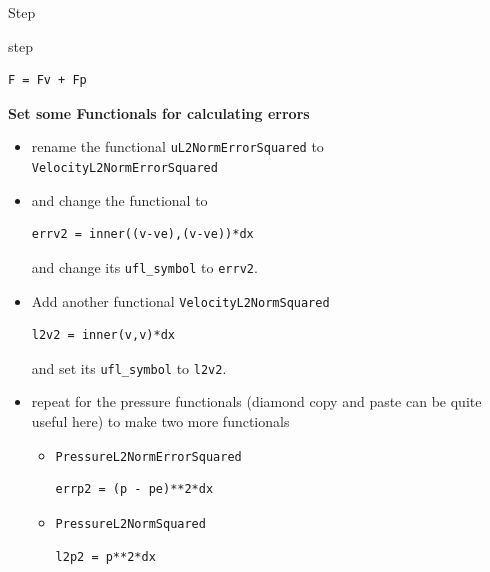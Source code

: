 \begin{steps}{Step}
\begin{steps}{step}
\begin{lstlisting}[style=UFL]
F = Fv + Fp
    \end{lstlisting}
  \item\textbf{ Set some Functionals for calculating errors}
 \begin{itemize}
 \item rename the functional \texttt{uL2NormErrorSquared} to \texttt{VelocityL2NormErrorSquared} 
    \item and change  the functional to
      \begin{lstlisting}[style=Ufl]
        errv2 = inner((v-ve),(v-ve))*dx
      \end{lstlisting}
      and change its \texttt{ufl\_symbol} to \texttt{errv2}.
    \item Add another functional \texttt{VelocityL2NormSquared}
      \begin{lstlisting}[style=Ufl]
        l2v2 = inner(v,v)*dx
      \end{lstlisting}
      and set its \texttt{ufl\_symbol} to \texttt{l2v2}.
    \item repeat for the pressure functionals (diamond copy and paste can be
      quite useful here) to make two more functionals
      \begin{itemize}
      \item \texttt{PressureL2NormErrorSquared}
        \begin{lstlisting}[style=Ufl]
        errp2 = (p - pe)**2*dx
      \end{lstlisting}
    \item \texttt{PressureL2NormSquared}
        \begin{lstlisting}[style=Ufl]
        l2p2 = p**2*dx
      \end{lstlisting}
      \end{itemize}

    \end{itemize}



\end{steps}
\end{steps}
